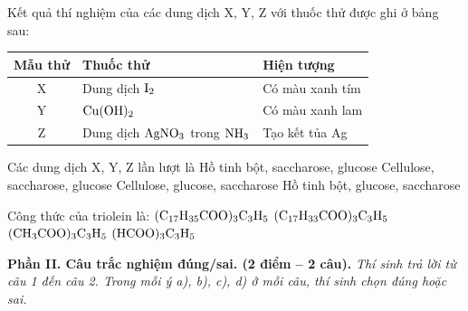 \documentclass[12pt,a4paper]{article}
\begin{document}
\begin{ex}
Kết quả thí nghiệm của các dung dịch X, Y, Z với thuốc thử được ghi ở bảng sau:
\begin{center}
\begin{tabular}{|c|l|l|}
\hline
\textbf{Mẫu thử} & \textbf{Thuốc thử} & \textbf{Hiện tượng} \\ \hline
X & Dung dịch $\ce{I2}$ & Có màu xanh tím \\ \hline
Y & $\ce{Cu(OH)2}$ & Có màu xanh lam \\ \hline
Z & Dung dịch $\ce{AgNO3}$ trong $\ce{NH3}$ & Tạo kết tủa Ag \\ \hline
\end{tabular}
\end{center}
Các dung dịch X, Y, Z lần lượt là
\choice
{\True Hồ tinh bột, saccharose, glucose}
{Cellulose, saccharose, glucose}
{Cellulose, glucose, saccharose}
{Hồ tinh bột, glucose, saccharose}
\end{ex}

\begin{ex}
Công thức của triolein là:
\choice
{$\ce{(C17H35COO)3C3H5}$}
{\True $\ce{(C17H33COO)3C3H5}$}
{$\ce{(CH3COO)3C3H5}$}
{$\ce{(HCOO)3C3H5}$}
\end{ex}


\vspace{0.3cm}
\noindent
\textbf{Phần II. Câu trắc nghiệm đúng/sai. (2 điểm -- 2 câu).} \textit{Thí sinh trả lời từ câu 1 đến câu 2. Trong mỗi ý a), b), c), d) ở mỗi câu, thí sinh chọn đúng hoặc sai.}

\setcounter{ex}{0}
\end{document}

